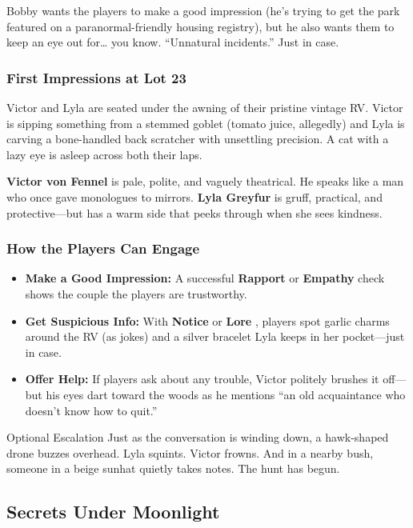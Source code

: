 Bobby wants the players to make a good impression (he’s trying to get the park featured on a paranormal-friendly housing registry), but he also wants them to keep an eye out for… you know. “Unnatural incidents.” Just in case.

\subsubsection*{First Impressions at Lot 23}
Victor and Lyla are seated under the awning of their pristine vintage RV. Victor is sipping something from a stemmed goblet (tomato juice, allegedly) and Lyla is carving a bone-handled back scratcher with unsettling precision. A cat with a lazy eye is asleep across both their laps.

\textbf{Victor von Fennel} is pale, polite, and vaguely theatrical. He speaks like a man who once gave monologues to mirrors.  
\textbf{Lyla Greyfur} is gruff, practical, and protective—but has a warm side that peeks through when she sees kindness.

\subsubsection*{How the Players Can Engage}
\begin{itemize}
    \item \textbf{Make a Good Impression:} A successful \textbf{Rapport} or \textbf{Empathy} check  shows the couple the players are trustworthy.
    \item \textbf{Get Suspicious Info:} With \textbf{Notice} or \textbf{Lore} , players spot garlic charms around the RV (as jokes) and a silver bracelet Lyla keeps in her pocket—just in case.
    \item \textbf{Offer Help:} If players ask about any trouble, Victor politely brushes it off—but his eyes dart toward the woods as he mentions “an old acquaintance who doesn’t know how to quit.”
\end{itemize}

\begin{CommentBox}{Optional Escalation}
    Just as the conversation is winding down, a hawk-shaped drone buzzes overhead. Lyla squints. Victor frowns. And in a nearby bush, someone in a beige sunhat quietly takes notes. The hunt has begun.
\end{CommentBox}

\subsection{Secrets Under Moonlight}

